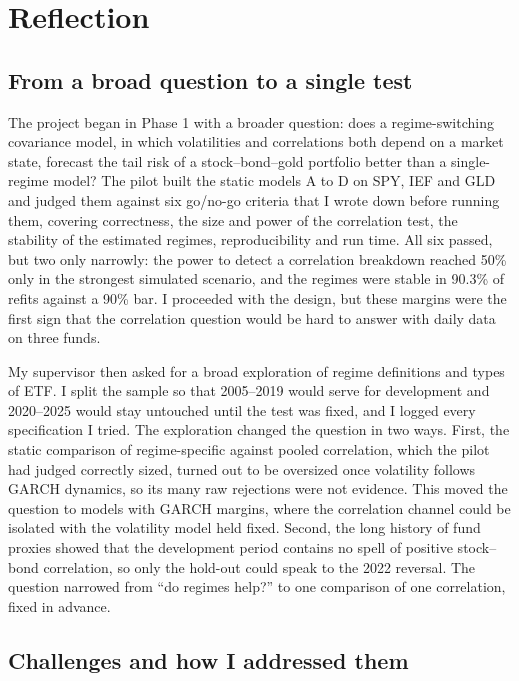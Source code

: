 \section{Reflection}\label{ch:reflection}

\subsection{From a broad question to a single test}\label{sec:refl-question}

The project began in Phase 1 with a broader question: does a regime-switching covariance model, in which volatilities and correlations both depend on a market state, forecast the tail risk of a stock--bond--gold portfolio better than a single-regime model? The pilot built the static models A to D on SPY, IEF and GLD and judged them against six go/no-go criteria that I wrote down before running them, covering correctness, the size and power of the correlation test, the stability of the estimated regimes, reproducibility and run time. All six passed, but two only narrowly: the power to detect a correlation breakdown reached 50\% only in the strongest simulated scenario, and the regimes were stable in 90.3\% of refits against a 90\% bar. I proceeded with the design, but these margins were the first sign that the correlation question would be hard to answer with daily data on three funds.

My supervisor then asked for a broad exploration of regime definitions and types of ETF. I split the sample so that 2005--2019 would serve for development and 2020--2025 would stay untouched until the test was fixed, and I logged every specification I tried. The exploration changed the question in two ways. First, the static comparison of regime-specific against pooled correlation, which the pilot had judged correctly sized, turned out to be oversized once volatility follows GARCH dynamics, so its many raw rejections were not evidence. This moved the question to models with GARCH margins, where the correlation channel could be isolated with the volatility model held fixed. Second, the long history of fund proxies showed that the development period contains no spell of positive stock--bond correlation, so only the hold-out could speak to the 2022 reversal. The question narrowed from ``do regimes help?'' to one comparison of one correlation, fixed in advance.

\subsection{Challenges and how I addressed them}\label{sec:refl-challenges}

